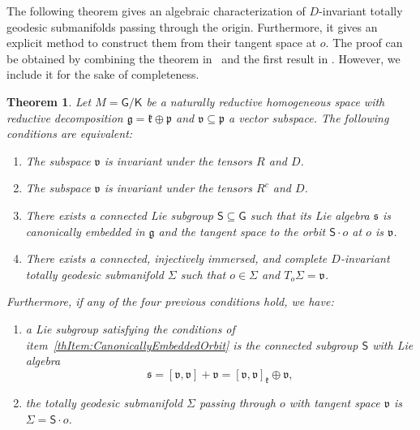 \documentclass[11pt,a4paper,final]{amsart}
\newcommand{\s}{\mathsf}
\newcommand{\g}{\mathfrak}
\newtheorem{theorem}{Theorem}[section]
\theoremstyle{definition}
\begin{document}
The following theorem gives an algebraic characterization of $D$-invariant totally geodesic submanifolds passing through the origin.
Furthermore, it gives an explicit method to construct them from their tangent space at $o$.
The proof can be obtained by combining the theorem in~\cite[p.~11]{Sagle} and the first result in \cite[\S 2]{HermannTotallyGeodesicOrbits}.
However, we include it for the sake of completeness.
\begin{theorem}\label{th:CharacterizationDInvariantTGSubmanifolds}
	Let $M=\s{G}/\s{K}$ be a naturally reductive homogeneous space with reductive decomposition $\g{g}=\g{k}\oplus\g{p}$ and $\g{v}\subseteq \g{p}$ a vector subspace.
	The following conditions are equivalent:
	\begin{enumerate}[\rm (i)]
		\item\label{thItem:RDInvariant} The subspace $\g{v}$ is invariant under the tensors $R$ and $D$.
		\item\label{thItem:RcDInvariant} The subspace $\g{v}$ is invariant under the tensors $R^c$ and $D$.
		\item\label{thItem:CanonicallyEmbeddedOrbit} There exists a connected Lie subgroup $\s{S}\subseteq \s{G}$ such that its Lie algebra $\g{s}$ is canonically embedded in $\g{g}$ and the tangent space to the orbit $\s{S}\cdot o$ at $o$ is $\g{v}$.
		\item\label{thItem:DInvariantTGSubmanifold} There exists a connected, injectively immersed, and complete $D$-invariant totally geodesic submanifold $\Sigma$ such that $o\in \Sigma$ and $T_{o}\Sigma=\g{v}$.
	\end{enumerate}
	Furthermore, if any of the four previous conditions hold, we have:
	\begin{enumerate}[\rm(1)]
		\item\label{thItem:CanonicallyEmbeddedSubalgebraConstruction} a Lie subgroup satisfying the conditions of item~\eqref{thItem:CanonicallyEmbeddedOrbit} is the connected subgroup $\s{S}$ with Lie algebra
		\[
			\g{s}=[\g{v},\g{v}]+\g{v}=[\g{v},\g{v}]_{\g{k}}\oplus\g{v},
		\]
		\item\label{thItem:TGOrbitConstruction} the totally geodesic submanifold $\Sigma$ passing through $o$ with tangent space $\g{v}$ is $\Sigma=\s{S}\cdot o$.
	\end{enumerate}
\end{theorem}
\end{document}
